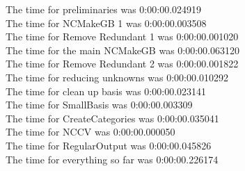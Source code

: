 \documentclass[rep10,leqno]{report}
\begin{document}
\noindent
The time for preliminaries was 0:00:00.024919\\
The time for NCMakeGB 1 was 0:00:00.003508\\
The time for Remove Redundant 1 was 0:00:00.001020\\
The time for the main NCMakeGB was 0:00:00.063120\\
The time for Remove Redundant 2 was 0:00:00.001822\\
The time for reducing unknowns was 0:00:00.010292\\
The time for clean up basis was 0:00:00.023141\\
The time for SmallBasis was 0:00:00.003309\\
The time for CreateCategories was 0:00:00.035041\\
The time for NCCV was 0:00:00.000050\\
The time for RegularOutput was 0:00:00.045826\\
The time for everything so far was 0:00:00.226174\\
\end{document}
